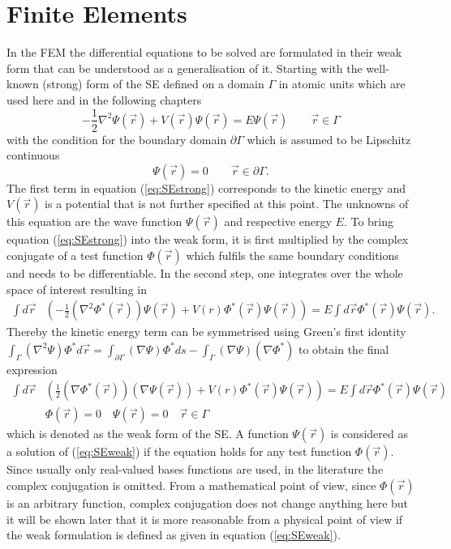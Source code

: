 \section{Finite Elements}
\label{ch:introFEM}
In the FEM the differential equations to be solved are formulated in their weak form that can be understood as a generalisation of it.
Starting with the well-known (strong) form of the SE defined on a domain $ \Gamma$ in atomic units which are used here and in the following chapters
\begin{equation} \label{eq:SEstrong}
-\frac 12 \nabla^2\Psi(\vec{r})+ V(\vec{r})\Psi(\vec{r})=E \Psi(\vec{r}) \qquad  \vec{r}\in \Gamma
\end{equation}
with the condition for the boundary domain $\partial \Gamma$ which is assumed to be Lipschitz continuous
\begin{equation}
    \Psi(\vec{r})=0  \qquad \vec{r} \in \partial \Gamma.
\end{equation}
The first term in equation (\ref{eq:SEstrong}) corresponds to the kinetic energy and $V(\vec{r})$ is a potential that is not further specified at this point.
The unknowns of this equation are the wave function $\Psi(\vec{r})$ and respective energy $E$.
To bring equation (\ref{eq:SEstrong}) into the weak form, it is first multiplied by the complex conjugate of a test function $\Phi(\vec{r})$ which fulfils the same boundary conditions and needs to be differentiable.
In the second step, one integrates over the whole space of interest resulting in
\begin{align}
\int d \vec{r} & \left( - \frac 12 \left(\nabla^2\Phi^*(\vec{r})\right)\Psi(\vec{r})
               + V(r) \Phi^*(\vec{r}) \Psi(\vec{r})\right) = E \int d \vec{r} \Phi^*(\vec{r}) \Psi(\vec{r}).
\end{align}
Thereby the kinetic energy term can be symmetrised using Green's first identity $\int_\Gamma (\nabla^2\Psi)\Phi^* d\vec{r}=\int_{\partial \Gamma} (\nabla\Psi)\Phi^* ds -\int_\Gamma (\nabla\Psi)(\nabla\Phi^*)$ to obtain the final expression
\begin{align}\label{eq:SEweak}
\int d \vec{r} & \left(  \frac 12 \left(\nabla\Phi^*(\vec{r})\right) \left(\nabla\Psi(\vec{r})\right) 
               + V(r) \Phi^*(\vec{r}) \Psi(\vec{r})\right) = E \int d \vec{r} \Phi^*(\vec{r}) \Psi(\vec{r})\\
    &\Phi(\vec{r})=0\quad
     \Psi(\vec{r})=0\quad  \vec{r}\in\Gamma
\end{align}
which is denoted as the weak form of the SE.
A function $\Psi(\vec{r})$ is considered as a solution of (\ref{eq:SEweak}) if the equation holds for any test function $\Phi(\vec{r})$.
Since usually only real-valued bases functions are used, in the literature the complex conjugation is omitted.
From a mathematical point of view, since $\Phi(\vec{r})$ is an arbitrary function, complex conjugation does not change anything here but it will be shown later that it is more reasonable from a physical point of view if the weak formulation is defined as given in equation (\ref{eq:SEweak}).

